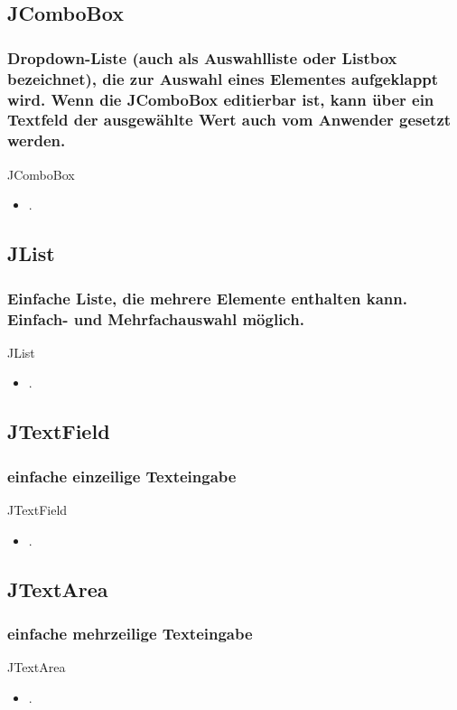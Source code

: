 \documentclass[xcolor=dvipsnames]{beamer}
\begin{document}
\subsection{JComboBox}
\begin{frame} %
  \frametitle{Dropdown-Liste (auch als Auswahlliste oder Listbox bezeichnet), die zur Auswahl eines Elementes aufgeklappt wird. Wenn die JComboBox editierbar ist, kann über ein Textfeld der ausgewählte Wert auch vom Anwender gesetzt werden.} %
  \begin{block}{JComboBox}
	  \begin{itemize}
		\item .
	  \end{itemize}
  \end{block}
\end{frame}


\subsection{JList}
\begin{frame} %
  \frametitle{Einfache Liste, die mehrere Elemente enthalten kann. Einfach- und Mehrfachauswahl möglich.} %
  \begin{block}{JList}
	  \begin{itemize}
		\item .
	  \end{itemize}
  \end{block}
\end{frame}

\subsection{JTextField}
\begin{frame} %
  \frametitle{einfache einzeilige Texteingabe
} %
  \begin{block}{JTextField}
	  \begin{itemize}
		\item .
	  \end{itemize}
  \end{block}
\end{frame}

\subsection{JTextArea}
\begin{frame} %
  \frametitle{einfache mehrzeilige Texteingabe
} %
  \begin{block}{JTextArea}
	  \begin{itemize}
		\item .
	  \end{itemize}
  \end{block}
\end{frame}
\end{document}
